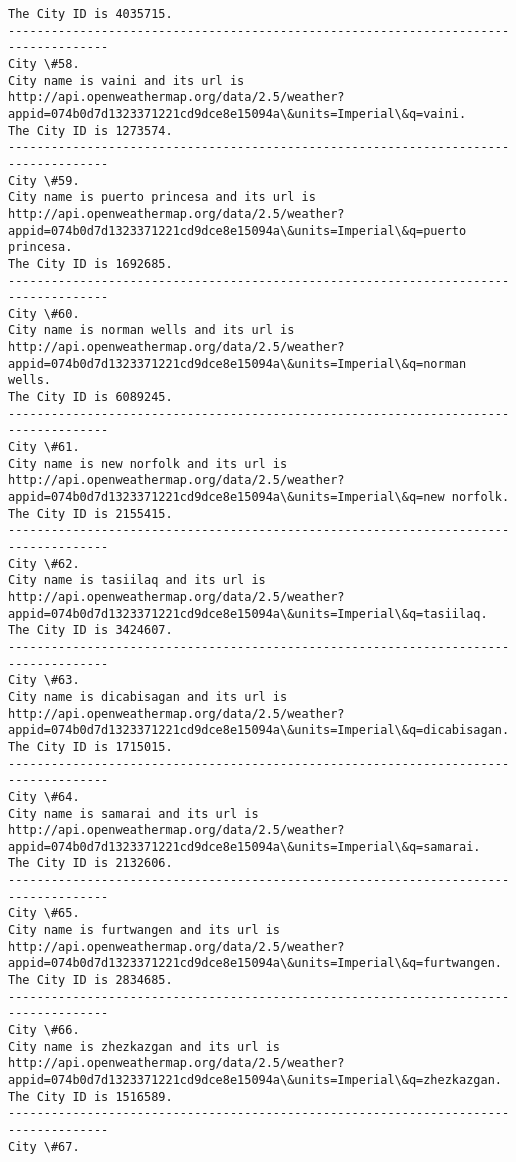 \documentclass[11pt]{article}
\begin{document}
\begin{Verbatim}[commandchars=\\\{\}]
The City ID is 4035715.
------------------------------------------------------------------------------------
City \#58.
City name is vaini and its url is http://api.openweathermap.org/data/2.5/weather?appid=074b0d7d1323371221cd9dce8e15094a\&units=Imperial\&q=vaini.
The City ID is 1273574.
------------------------------------------------------------------------------------
City \#59.
City name is puerto princesa and its url is http://api.openweathermap.org/data/2.5/weather?appid=074b0d7d1323371221cd9dce8e15094a\&units=Imperial\&q=puerto princesa.
The City ID is 1692685.
------------------------------------------------------------------------------------
City \#60.
City name is norman wells and its url is http://api.openweathermap.org/data/2.5/weather?appid=074b0d7d1323371221cd9dce8e15094a\&units=Imperial\&q=norman wells.
The City ID is 6089245.
------------------------------------------------------------------------------------
City \#61.
City name is new norfolk and its url is http://api.openweathermap.org/data/2.5/weather?appid=074b0d7d1323371221cd9dce8e15094a\&units=Imperial\&q=new norfolk.
The City ID is 2155415.
------------------------------------------------------------------------------------
City \#62.
City name is tasiilaq and its url is http://api.openweathermap.org/data/2.5/weather?appid=074b0d7d1323371221cd9dce8e15094a\&units=Imperial\&q=tasiilaq.
The City ID is 3424607.
------------------------------------------------------------------------------------
City \#63.
City name is dicabisagan and its url is http://api.openweathermap.org/data/2.5/weather?appid=074b0d7d1323371221cd9dce8e15094a\&units=Imperial\&q=dicabisagan.
The City ID is 1715015.
------------------------------------------------------------------------------------
City \#64.
City name is samarai and its url is http://api.openweathermap.org/data/2.5/weather?appid=074b0d7d1323371221cd9dce8e15094a\&units=Imperial\&q=samarai.
The City ID is 2132606.
------------------------------------------------------------------------------------
City \#65.
City name is furtwangen and its url is http://api.openweathermap.org/data/2.5/weather?appid=074b0d7d1323371221cd9dce8e15094a\&units=Imperial\&q=furtwangen.
The City ID is 2834685.
------------------------------------------------------------------------------------
City \#66.
City name is zhezkazgan and its url is http://api.openweathermap.org/data/2.5/weather?appid=074b0d7d1323371221cd9dce8e15094a\&units=Imperial\&q=zhezkazgan.
The City ID is 1516589.
------------------------------------------------------------------------------------
City \#67.

\end{Verbatim}
\end{document}

